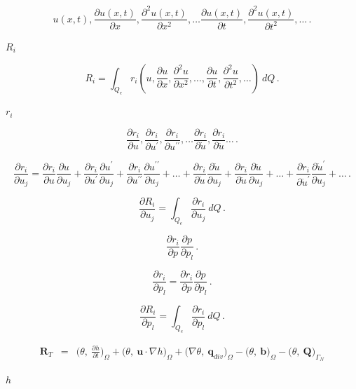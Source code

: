 \documentclass{article}
\begin{document}
\[u(x, t), \frac{\partial u(x, t)}{\partial x},  \frac{\partial^2 u(x, t)}{\partial x^2}, \dots \frac{\partial u(x, t)}{\partial t}, \frac{\partial^2 u(x, t)}{\partial t^2},\dots \,.\]
\pagebreak

$ R_i $
\pagebreak

\[R_i = \int_{Q_e} r_i \left(u, \frac{\partial u}{\partial x}, \frac{\partial^2 u}{\partial x^2}, \dots, \frac{\partial u}{\partial t}, \frac{\partial^2 u}{\partial t^2}, \dots \right)\ dQ\,.\]
\pagebreak

$r_i$
\pagebreak

\[\frac{\partial r_i}{\partial u}, \frac{\partial r_i}{\partial u^{\prime}}, \frac{\partial r_i}{\partial u^{\prime \prime}}, \dots \frac{\partial r_i}{\partial \dot{u}}, \frac{\partial r_i}{\partial \ddot{u}} \dots\,.\]
\pagebreak

\[\frac{\partial r_i}{\partial u_j} =  
 \frac{\partial r_i}{\partial u} \frac{\partial u}{\partial u_j} 
+ \frac{\partial r_i}{\partial u^{\prime}} \frac{\partial u^{\prime}}{\partial u_j} 
+ \frac{\partial r_i}{\partial u^{\prime \prime}} \frac{\partial u^{\prime \prime}}{\partial u_j} 
+ \dots
+ \frac{\partial r_i}{\partial \dot{u}} \frac{\partial \dot{u}}{\partial u_j}
+ \frac{\partial r_i}{\partial \ddot{u}} \frac{\partial \ddot{u}}{\partial u_j}   
+ \dots
+ \frac{\partial r_i}{\partial \dot{u}^{\prime}} \frac{\partial \dot{u}^{\prime}}{\partial u_j}
+ \dots\,.\]
\pagebreak

\[\frac{\partial R_i}{\partial u_j} = \int_{Q_e} \frac{\partial r_i}{\partial u_j} \ dQ\,.\]
\pagebreak

\[\frac{\partial r_i}{\partial p} \frac{\partial p}{\partial p_l}\,.\]
\pagebreak

\[\frac{\partial r_i}{\partial p_l} = \frac{\partial r_i}{\partial p} \frac{\partial p}{\partial p_l}\,.\]
\pagebreak

\[\frac{\partial R_i}{\partial p_l} = \int_{Q_e} \frac{\partial r_i}{\partial p_l} \ dQ\,.\]
\pagebreak

\[
\begin{array}{lll}
\mathbf{R}_{T} & = & \displaystyle
  \bigg( \theta,\ \frac{\partial h}{\partial t} \bigg)_{\Omega}
+ \bigg( \theta,\  \mathbf{u} \cdot \nabla h \bigg)_{\Omega}
+ \bigg( \nabla \theta,\  \mathbf{q}_{div} \bigg)_{\Omega}
- \bigg( \theta,\ \mathbf{b}\bigg)_{\Omega}
- \bigg( \theta,\ \mathbf{Q}\bigg)_{\Gamma_N}  
\end{array}
\]
\pagebreak

$ h $
\pagebreak
\end{document}
